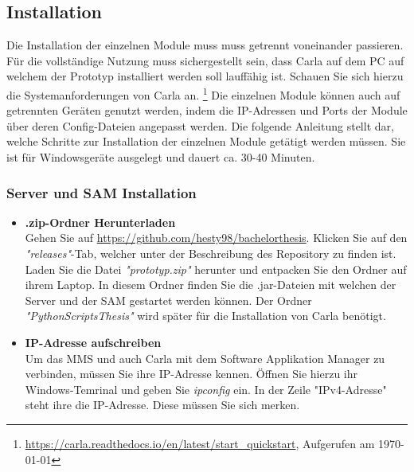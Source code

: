 \subsection{Installation}
Die Installation der einzelnen Module muss muss getrennt voneinander passieren. Für die vollständige Nutzung muss sichergestellt sein, dass Carla auf dem PC auf welchem der Prototyp installiert werden soll lauffähig ist. Schauen Sie sich hierzu die Systemanforderungen von Carla an.  \footnote{\url{https://carla.readthedocs.io/en/latest/start_quickstart}, Aufgerufen am \today} Die einzelnen Module können auch auf getrennten Geräten genutzt werden, indem die IP-Adressen und Ports der Module über deren Config-Dateien angepasst werden. Die folgende Anleitung stellt dar, welche Schritte zur Installation der einzelnen Module getätigt werden müssen. Sie ist für Windowsgeräte ausgelegt und dauert ca. 30-40 Minuten.


\subsubsection{Server und SAM Installation}
\begin{itemize}
	\item[\textbf{1.}] \textbf{.zip-Ordner Herunterladen}\\
	Gehen Sie auf \url{https://github.com/hesty98/bachelorthesis}. Klicken Sie auf den \textit{"releases"}-Tab, welcher unter der Beschreibung des Repository zu finden ist.
	Laden Sie die Datei \textit{"prototyp.zip"} herunter und entpacken Sie den Ordner auf ihrem Laptop. In diesem Ordner finden Sie die .jar-Dateien mit welchen der Server und der SAM gestartet werden können. Der Ordner \textit{"PythonScriptsThesis"} wird später für die Installation von Carla benötigt.
	
	\item[\textbf{2.}] \textbf{IP-Adresse aufschreiben}\\
	Um das MMS und auch Carla mit dem Software Applikation Manager zu verbinden, müssen Sie ihre IP-Adresse kennen. Öffnen Sie hierzu ihr Windows-Temrinal und geben Sie \textit{ipconfig} ein. In der Zeile "IPv4-Adresse" steht ihre die IP-Adresse. Diese müssen Sie sich merken.
\end{itemize}



